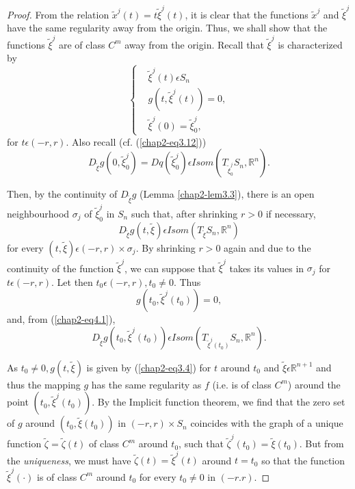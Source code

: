 \begin{proof}
From the relation $\widetilde{x}^{j}(t) = t\widetilde{\xi}^{j}(t)$, it
is clear that the functions $\widetilde{x}^{j}$ and
$\widetilde{\xi}^{j}$ have the same regularity away from the
origin. Thus, we shall show that the functions $\widetilde{\xi}^{j}$
are of class $C^{m}$ away from the origin. Recall that
$\widetilde{\xi}^{j}$ is characterized by 
\begin{equation*}
\begin{cases}
& \widetilde{\xi}^{j}(t) \epsilon S_{n}\\
& g(t, \widetilde{\xi}^{j}(t)) = 0,\\
& \widetilde{\xi}^{j}(0) = \widetilde{\xi}_{0}^{j},
\end{cases}
\end{equation*}
for $t \epsilon (-r, r)$. Also recall (cf. (\ref{chap2-eq3.12}))
$$
D_{\widetilde{\xi}}g(0, \widetilde{\xi}_{0}^{j}) =
Dq(\widetilde{\xi}_{0}^{j}) \epsilon Isom (T_{\widetilde{\xi}_{0}^{j}}
S_{n}, \mathbb{R}^{n}).
$$

Then, by the continuity of $D_{\widetilde{\xi}}g$ (Lemma
\ref{chap2-lem3.3}), there is an open neighbourhood $\sigma_{j}$ of
$\widetilde{\xi}_{0}^{j}$ in $S_{n}$ such that, after shrinking $r >
0$ if necessary,
\begin{equation*}
D_{\widetilde{\xi}}g(t, \widetilde{\xi}) \epsilon Isom
(T_{\widetilde{\xi}}S_{n}, \mathbb{R}^{n})\tag{4.1}\label{chap2-eq4.1}
\end{equation*}
for every $(t, \widetilde{\xi}) \epsilon (-r, r) \times
\sigma_{j}$. By shrinking $r > 0$ again and due to the continuity of
the function $\widetilde{\xi}^{j}$, we can suppose that
$\widetilde{\xi}^{j}$ takes its values in $\sigma_{j}$ for $t \epsilon
(-r, r)$. Let then $t_{0} \epsilon (-r, r), t_{0} \neq 0$. Thus
$$
g(t_{0}, \widetilde{\xi}^{j}(t_{0})) = 0,
$$
and, from (\ref{chap2-eq4.1}),
$$
D_{\widetilde{\xi}}g(t_{0}, \widetilde{\xi}^{j}(t_{0})) \epsilon Isom
(T_{\widetilde{\xi}^{j} (t_{0})} S_{n}, \mathbb{R}^{n}).
$$\pageoriginale

As $t_{0} \neq 0, g(t, \widetilde{\xi})$ is given by
(\ref{chap2-eq3.4}) for $t$ around $t_{0}$ and $\widetilde{\xi} \epsilon
\mathbb{R}^{n+1}$ and thus the mapping $g$ has the same regularity as
$f$ (i.e. is of class $C^{m}$) around the point $(t_{0},
\widetilde{\xi}^{j}(t_{0}))$. By the Implicit function theorem, we
find that the zero set of $g$ around $(t_{0}, \widetilde{\xi}(t_{0}))$
in $(-r, r) \times S_{n}$ coincides with the graph of a unique
function $\widetilde{\zeta} = \widetilde{\zeta}(t)$ of class $C^{m}$
around $t_{0}$, such that $\widetilde{\zeta}^j (t_{0}) =
\widetilde{\xi}(t_{0})$. But from the {\em uniqueness}, we must have
$\widetilde{\zeta}(t) = \widetilde{\xi}^{j}(t)$ around $t = t_{0}$ so
that the function $\widetilde{\xi}^{j}(\cdot)$ is of class $C^{m}$
around $t_{0}$ for every $t_{0} \neq 0$ in $(-r. r)$.
\end{proof}

